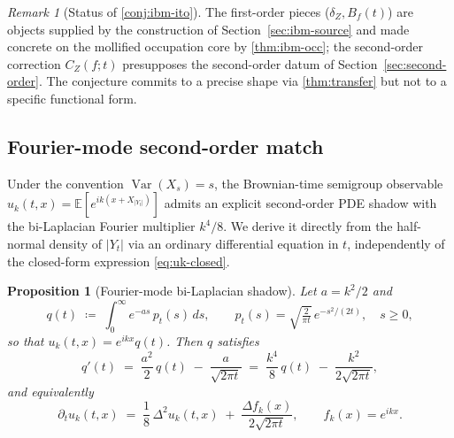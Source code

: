 \documentclass[11pt,reqno]{amsart}
\theoremstyle{plain}
\newtheorem{proposition}[theorem]{Proposition}
\theoremstyle{definition}
\theoremstyle{remark}
\newtheorem{remark}[theorem]{Remark}
\newcommand{\E}{\mathbb{E}}
\newcommand{\IBM}{Z}
\DeclareMathOperator{\Var}{Var}
\begin{document}
\begin{remark}[Status of \cref{conj:ibm-ito}]
The first-order pieces ($\delta_\IBM, B_f(t)$) are objects supplied by
the construction of Section~\ref{sec:ibm-source} and made concrete on
the mollified occupation core by \cref{thm:ibm-occ}; the second-order
correction $C_\IBM(f;t)$ presupposes the second-order datum of
Section~\ref{sec:second-order}. The conjecture commits to a precise
shape via \cref{thm:transfer} but not to a specific functional form.
\end{remark}

\subsection*{Fourier-mode second-order match}

Under the convention $\Var(X_s)=s$, the Brownian-time semigroup
observable $u_k(t,x)=\E[e^{ik(x+X_{|Y_t|})}]$ admits an explicit
second-order PDE shadow with the bi-Laplacian Fourier multiplier
$k^{4}/8$. We derive it directly from the half-normal density of
$|Y_t|$ via an ordinary differential equation in $t$, independently
of the closed-form expression \eqref{eq:uk-closed}.

\begin{proposition}[Fourier-mode bi-Laplacian shadow]
\label{prop:fourier-2nd}
Let $a=k^{2}/2$ and
\[
  q(t)\;\coloneqq\;\int_0^\infty e^{-as}\,p_t(s)\,ds,
  \qquad p_t(s)=\sqrt{\tfrac{2}{\pi t}}\,e^{-s^{2}/(2t)},\quad s\ge 0,
\]
so that $u_k(t,x)=e^{ikx}q(t)$. Then $q$ satisfies
\begin{equation}\label{eq:q-ode}
  q'(t)\;=\;\frac{a^{2}}{2}\,q(t)\;-\;\frac{a}{\sqrt{2\pi t}}
  \;=\;\frac{k^{4}}{8}\,q(t)\;-\;\frac{k^{2}}{2\sqrt{2\pi t}},
\end{equation}
and equivalently
\begin{equation}\label{eq:az-prop}
  \partial_t u_k(t,x)
  \;=\;\frac{1}{8}\,\Delta^{2}u_k(t,x)
       \;+\;\frac{\Delta f_k(x)}{2\sqrt{2\pi t}},
  \qquad f_k(x)=e^{ikx}.
\end{equation}
\end{proposition}
\end{document}
